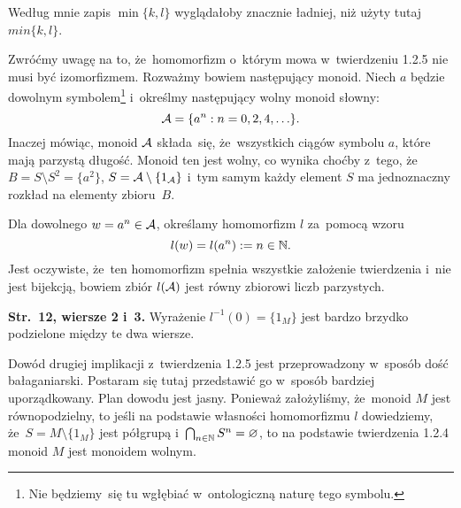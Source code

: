 \documentclass[a4paper,11pt]{article}
\begin{document}
\start {} Według mnie zapis $\min\{ k, l \}$ wyglądałoby znacznie
ładniej, niż użyty tutaj $min\{ k, l \}$.

\vspace{\spaceFour}





\start {} Zwróćmy uwagę na to, że~homomorfizm o~którym mowa
w~twierdzeniu 1.2.5 nie musi być izomorfizmem. Rozważmy bowiem następujący
monoid. Niech $a$ będzie dowolnym symbolem\footnote{Nie będziemy~się tu
  wgłębiać w~ontologiczną naturę tego symbolu.} i~określmy następujący
wolny monoid słowny:
\begin{equation}
  \label{eq:Forys-Forys-???}
  \mathcal{A} = \{ a^{ n } : n = 0, 2, 4, \ldots \}.
\end{equation}
Inaczej mówiąc, monoid $\mathcal{A}$ składa~się, że~wszystkich ciągów symbolu
$a$, które mają parzystą długość. Monoid ten jest wolny, co wynika choćby
z~tego, że~$B = S \setminus S^{ 2 } = \{ a^{ 2 } \}$, $S = \mathcal{A} \setminus \{ 1_{ \mathcal{A} } \}$ i~tym
samym każdy element $S$ ma jednoznaczny rozkład na elementy zbioru~$B$.

Dla dowolnego $w = a^{ n } \in \mathcal{A}$, określamy homomorfizm $l$ za~pomocą
wzoru
\begin{equation}
  \label{eq:Forys-Forys-???}
  l( w ) = l( a^{ n } ) := n \in \mathbb{N}.
\end{equation}
Jest oczywiste, że~ten homomorfizm spełnia wszystkie założenie twierdzenia
i~nie jest bijekcją, bowiem zbiór $l( \mathcal{A} )$ jest równy zbiorowi liczb
parzystych.

\vspace{\spaceFour}





\start \textbf{Str.~12, wiersze 2 i~3.} Wyrażenie
$l^{ -1 }( 0 ) = \{ 1_{ M } \}$ jest bardzo brzydko podzielone między te dwa
wiersze.

\vspace{\spaceFour}





\start {} Dowód drugiej implikacji z~twierdzenia 1.2.5 jest
przeprowadzony w~sposób dość bałaganiarski. Postaram się tutaj przedstawić
go w~sposób bardziej uporządkowany. Plan dowodu jest jasny. Ponieważ
założyliśmy, że~monoid $M$ jest równopodzielny, to jeśli na podstawie
własności homomorfizmu $l$ dowiedziemy, że~$S = M \setminus \{ 1_{ M } \}$ jest
półgrupą i~$\bigcap_{ n \in \mathbb{N} } S^{ n } = \varnothing$, to na podstawie twierdzenia 1.2.4
monoid $M$ jest monoidem wolnym.
\end{document}
